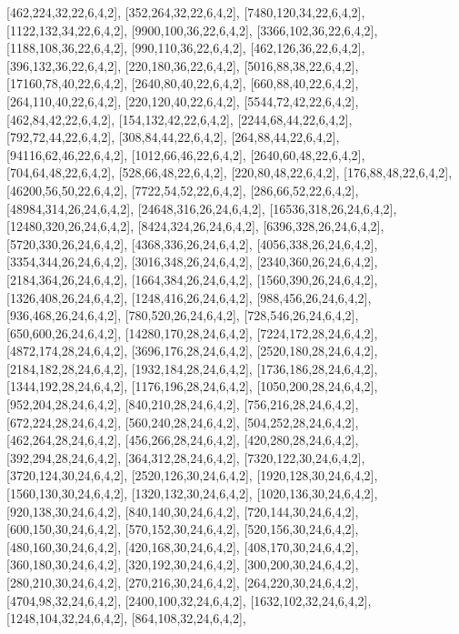 \documentclass[12pt]{amsart}
\begin{document}
[462,224,32,22,6,4,2],   [352,264,32,22,6,4,2],   [7480,120,34,22,6,4,2],   [1122,132,34,22,6,4,2],   [9900,100,36,22,6,4,2],   [3366,102,36,22,6,4,2],
[1188,108,36,22,6,4,2],   [990,110,36,22,6,4,2],   [462,126,36,22,6,4,2],   [396,132,36,22,6,4,2],   [220,180,36,22,6,4,2],   [5016,88,38,22,6,4,2],
[17160,78,40,22,6,4,2],   [2640,80,40,22,6,4,2],   [660,88,40,22,6,4,2],   [264,110,40,22,6,4,2],   [220,120,40,22,6,4,2],   [5544,72,42,22,6,4,2],   [462,84,42,22,6,4,2],
[154,132,42,22,6,4,2],   [2244,68,44,22,6,4,2],   [792,72,44,22,6,4,2],   [308,84,44,22,6,4,2],   [264,88,44,22,6,4,2],   [94116,62,46,22,6,4,2],   [1012,66,46,22,6,4,2],
[2640,60,48,22,6,4,2],   [704,64,48,22,6,4,2],   [528,66,48,22,6,4,2],   [220,80,48,22,6,4,2],   [176,88,48,22,6,4,2],   [46200,56,50,22,6,4,2],   [7722,54,52,22,6,4,2],
[286,66,52,22,6,4,2],   [48984,314,26,24,6,4,2],   [24648,316,26,24,6,4,2],   [16536,318,26,24,6,4,2],   [12480,320,26,24,6,4,2],   [8424,324,26,24,6,4,2],
[6396,328,26,24,6,4,2],   [5720,330,26,24,6,4,2],   [4368,336,26,24,6,4,2],   [4056,338,26,24,6,4,2],   [3354,344,26,24,6,4,2],   [3016,348,26,24,6,4,2],
[2340,360,26,24,6,4,2],   [2184,364,26,24,6,4,2],   [1664,384,26,24,6,4,2],   [1560,390,26,24,6,4,2],   [1326,408,26,24,6,4,2],   [1248,416,26,24,6,4,2],
[988,456,26,24,6,4,2],   [936,468,26,24,6,4,2],   [780,520,26,24,6,4,2],   [728,546,26,24,6,4,2],   [650,600,26,24,6,4,2],   [14280,170,28,24,6,4,2],
[7224,172,28,24,6,4,2],   [4872,174,28,24,6,4,2],   [3696,176,28,24,6,4,2],   [2520,180,28,24,6,4,2],   [2184,182,28,24,6,4,2],   [1932,184,28,24,6,4,2],
[1736,186,28,24,6,4,2],   [1344,192,28,24,6,4,2],   [1176,196,28,24,6,4,2],   [1050,200,28,24,6,4,2],   [952,204,28,24,6,4,2],   [840,210,28,24,6,4,2],
[756,216,28,24,6,4,2],   [672,224,28,24,6,4,2],   [560,240,28,24,6,4,2],   [504,252,28,24,6,4,2],   [462,264,28,24,6,4,2],   [456,266,28,24,6,4,2],
[420,280,28,24,6,4,2],   [392,294,28,24,6,4,2],   [364,312,28,24,6,4,2],   [7320,122,30,24,6,4,2],   [3720,124,30,24,6,4,2],   [2520,126,30,24,6,4,2],
[1920,128,30,24,6,4,2],   [1560,130,30,24,6,4,2],   [1320,132,30,24,6,4,2],   [1020,136,30,24,6,4,2],   [920,138,30,24,6,4,2],   [840,140,30,24,6,4,2],
[720,144,30,24,6,4,2],   [600,150,30,24,6,4,2],   [570,152,30,24,6,4,2],   [520,156,30,24,6,4,2],   [480,160,30,24,6,4,2],   [420,168,30,24,6,4,2],
[408,170,30,24,6,4,2],   [360,180,30,24,6,4,2],   [320,192,30,24,6,4,2],   [300,200,30,24,6,4,2],   [280,210,30,24,6,4,2],   [270,216,30,24,6,4,2],
[264,220,30,24,6,4,2],   [4704,98,32,24,6,4,2],   [2400,100,32,24,6,4,2],   [1632,102,32,24,6,4,2],   [1248,104,32,24,6,4,2],   [864,108,32,24,6,4,2],
\end{document}
